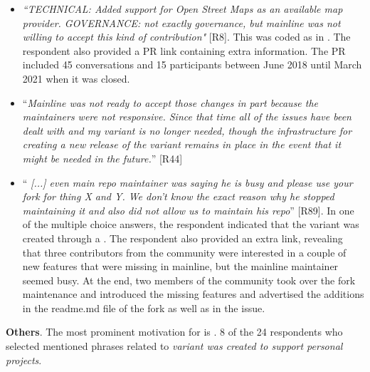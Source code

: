 \begin{itemize}[leftmargin=*]
\item \emph{``TECHNICAL: Added support for Open Street Maps as an available map provider. GOVERNANCE: not exactly governance, but mainline was not willing to accept this kind of contribution"} [R8]. This was coded as  in . The respondent also provided a \gh PR link containing extra information. The PR included 45 conversations and 15 participants between June 2018 until March 2021 when it was closed.

\item ``\emph{Mainline was not ready to accept those changes in part because the maintainers were not responsive. Since that time all of the issues have been dealt with and my variant is no longer needed, though the infrastructure for creating a new release of the variant remains in place in the event that it might be needed in the future.}'' [R44]

\item ``\emph{%
[...] even main repo maintainer was saying he is busy and please use your fork for thing X and Y. We don't know the exact reason why he stopped maintaining it and also did not allow us to maintain his repo}'' [R89]. In one of the multiple choice answers, the respondent indicated that the variant was created through a  .
The respondent also provided an extra link, revealing that
three contributors from the community were interested in a couple of new features that were missing in mainline, but the mainline maintainer seemed busy. At the end, two members of the community took over the fork maintenance and introduced the missing features and advertised the additions in the \textsf{readme.md} file of the fork as well as in the issue.

\end{itemize}


\nd \textbf{Others}. %
The most prominent motivation for  is  . 8 of the 24 respondents who selected  mentioned phrases related to \emph{variant was created to support personal projects}.


